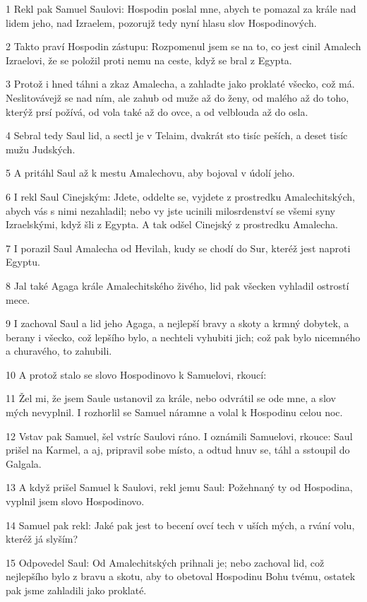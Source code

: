 \par 1 Rekl pak Samuel Saulovi: Hospodin poslal mne, abych te pomazal za krále nad lidem jeho, nad Izraelem, pozorujž tedy nyní hlasu slov Hospodinových.
\par 2 Takto praví Hospodin zástupu: Rozpomenul jsem se na to, co jest cinil Amalech Izraelovi, že se položil proti nemu na ceste, když se bral z Egypta.
\par 3 Protož i hned táhni a zkaz Amalecha, a zahladte jako proklaté všecko, což má. Neslitovávejž se nad ním, ale zahub od muže až do ženy, od malého až do toho, kterýž prsí požívá, od vola také až do ovce, a od velblouda až do osla.
\par 4 Sebral tedy Saul lid, a sectl je v Telaim, dvakrát sto tisíc peších, a deset tisíc mužu Judských.
\par 5 A pritáhl Saul až k mestu Amalechovu, aby bojoval v údolí jeho.
\par 6 I rekl Saul Cinejským: Jdete, oddelte se, vyjdete z prostredku Amalechitských, abych vás s nimi nezahladil; nebo vy jste ucinili milosrdenství se všemi syny Izraelskými, když šli z Egypta. A tak odšel Cinejský z prostredku Amalecha.
\par 7 I porazil Saul Amalecha od Hevilah, kudy se chodí do Sur, kteréž jest naproti Egyptu.
\par 8 Jal také Agaga krále Amalechitského živého, lid pak všecken vyhladil ostrostí mece.
\par 9 I zachoval Saul a lid jeho Agaga, a nejlepší bravy a skoty a krmný dobytek, a berany i všecko, což lepšího bylo, a nechteli vyhubiti jich; což pak bylo nicemného a churavého, to zahubili.
\par 10 A protož stalo se slovo Hospodinovo k Samuelovi, rkoucí:
\par 11 Žel mi, že jsem Saule ustanovil za krále, nebo odvrátil se ode mne, a slov mých nevyplnil. I rozhorlil se Samuel náramne a volal k Hospodinu celou noc.
\par 12 Vstav pak Samuel, šel vstríc Saulovi ráno. I oznámili Samuelovi, rkouce: Saul prišel na Karmel, a aj, pripravil sobe místo, a odtud hnuv se, táhl a sstoupil do Galgala.
\par 13 A když prišel Samuel k Saulovi, rekl jemu Saul: Požehnaný ty od Hospodina, vyplnil jsem slovo Hospodinovo.
\par 14 Samuel pak rekl: Jaké pak jest to becení ovcí tech v uších mých, a rvání volu, kteréž já slyším?
\par 15 Odpovedel Saul: Od Amalechitských prihnali je; nebo zachoval lid, což nejlepšího bylo z bravu a skotu, aby to obetoval Hospodinu Bohu tvému, ostatek pak jsme zahladili jako proklaté.
